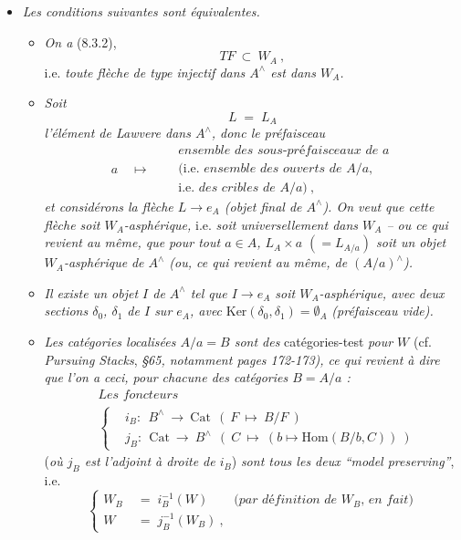 \documentclass[11pt]{article}
\newcommand{\msp}[1]{\marginpar{\raggedright\footnotesize [#1]}}
\newcommand{\Cat}{\mathrm{Cat}}
\newcommand{\chap}{^{\wedge}}
\begin{document}
\begin{itemize}[leftmargin=*]
\item[1$^\circ$)] \textit{Les conditions suivantes sont équivalentes.}
\begin{itemize}[leftmargin=*]
\item[a)] \textit{On a} (8.3.2),
\[
TF\ \subset\ W_A\ ,
\]
i.e. \textit{toute flèche de type injectif dans $A\chap$ est dans $W_A$.}
\item[b)] \textit{Soit}
\[
L \;=\; L_A
\tag*{(8.4.1)}
\]
\textit{l'élément de Lawvere dans $A\chap$, donc le préfaisceau}
\[
a \quad\longmapsto\quad
\begin{aligned}
&\textit{ensemble des sous-préfaisceaux de $a$}\\
&(\text{i.e. }\textit{ensemble des ouverts de $A/a$},\\
&\text{i.e. }\textit{des cribles de $A/a$})\ ,
\end{aligned}
\]
\textit{et considérons la flèche $L\longrightarrow e_A$ (objet final de $A\chap$). On veut que cette flèche soit $W_A$-asphérique,} i.e. \textit{soit universellement dans $W_A$ -- ou ce qui revient au même, que pour tout $a\in A$, $L_A\times a$ $(=L_{A/a})$ soit un objet $W_A$-asphérique}
\msp{page 106}
\textit{de $A\chap$ (ou, ce qui revient au même, de $(A/a)\chap$).}
\item[c)] \textit{Il existe un objet $I$ de $A\chap$ tel que $I\longrightarrow e_A$ soit $W_A$-asphérique, avec deux sections $\delta_0$, $\delta_1$ de $I$ sur $e_A$, avec} $\mathrm{Ker}(\delta_0,\delta_1)=\emptyset_A$ \textit{(préfaisceau vide).}
\item[d)] \textit{Les catégories localisées $A/a=B$ sont des} catégories-test \textit{pour $W$} (cf. \textit{Pursuing Stacks}, \textit{§65, notamment pages 172-173), ce qui revient à dire que l'on a ceci, pour chacune des catégories $B=A/a$ :}
\[
\begin{aligned}
&\textit{Les foncteurs}\\
&\left\{
\begin{aligned}
&i_B:\ \ B\chap \ \longrightarrow\ \Cat\ \ (\ F\ \longmapsto\ B/F\ )\\
&j_B:\ \ \Cat\ \longrightarrow\ B\chap\ \ (\ C\ \longmapsto\ (b\longmapsto \mathrm{Hom}(B/b,C))\ )
\end{aligned}
\right.
\end{aligned}
\tag*{(8.4.2)}
\]
(\textit{où $j_B$ est l'adjoint à droite de $i_B$}) \textit{sont tous les deux ``model preserving''}, i.e.
\[
\left\{
\begin{aligned}
W_B \;&=\; i_B^{-1}(W) \qquad \textit{(par définition de $W_B$, en fait)}\\
W \;&=\; j_B^{-1}(W_B)\ ,
\end{aligned}
\right.
\tag*{(8.4.3)}
\]
\end{itemize}
\end{itemize}
\end{document}
